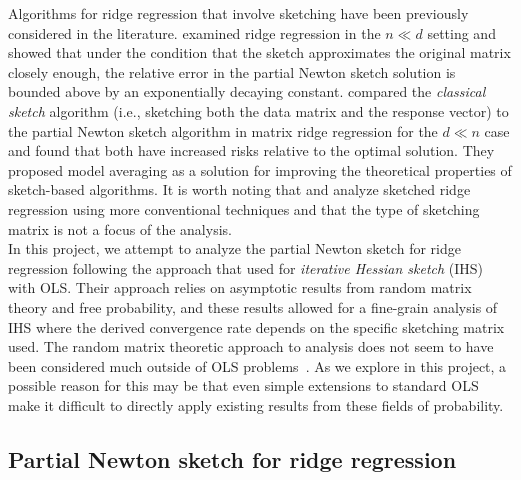 Algorithms for ridge regression that involve sketching have been previously considered in the literature. \citet{Chowdhury:2018} examined ridge regression in the $n\ll d$ setting and showed that under the condition that the sketch approximates the original matrix closely enough, the relative error in the partial Newton sketch solution is bounded above by an exponentially decaying constant. \citet{Wang:2017} compared the \textit{classical sketch} algorithm (i.e., sketching both the data matrix and the response vector) to the partial Newton sketch algorithm in matrix ridge regression for the $d\ll n$ case and found that both have increased risks relative to the optimal solution. They proposed model averaging as a solution for improving the theoretical properties of sketch-based algorithms. It is worth noting that \citet{Chowdhury:2018} and \citet{Wang:2017} analyze sketched ridge regression using more conventional techniques and that the type of sketching matrix is not a focus of the analysis.
\\

In this project, we attempt to analyze the partial Newton sketch for ridge regression following the approach that \citet{Lacotte:2020} used for \textit{iterative Hessian sketch} (IHS)~\citep{Pilanci:2016} with OLS. Their approach relies on asymptotic results from random matrix theory and free probability, and these results allowed for a fine-grain analysis of IHS where the derived convergence rate depends on the specific sketching matrix used. The random matrix theoretic approach to analysis does not seem to have been considered much outside of OLS problems~\citep{Dobriban:2019,Lacotte:2020b}. As we explore in this project, a possible reason for this may be that even simple extensions to standard OLS make it difficult to directly apply existing results from these fields of probability.


\subsection{Partial Newton sketch for ridge regression} \label{sec:ridgesketch}


